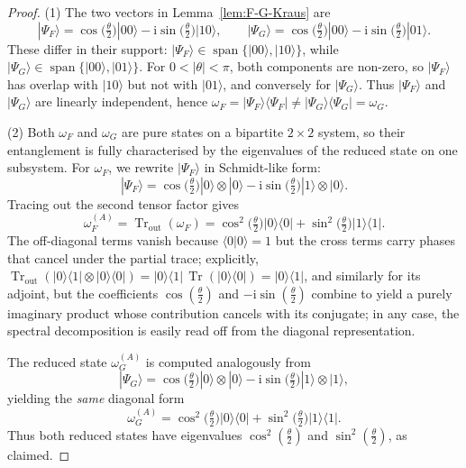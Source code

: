 \documentclass[11pt, reco]{article}
\begin{document}
\begin{proof}
(1) The two vectors in Lemma~\ref{lem:F-G-Kraus} are
\[
|\Psi_F\rangle
=
\cos\!\bigl(\tfrac{\theta}{2}\bigr)|00\rangle
-\mathrm{i}\sin\!\bigl(\tfrac{\theta}{2}\bigr)|10\rangle,
\qquad
|\Psi_G\rangle
=
\cos\!\bigl(\tfrac{\theta}{2}\bigr)|00\rangle
-\mathrm{i}\sin\!\bigl(\tfrac{\theta}{2}\bigr)|01\rangle.
\]
These differ in their support: \(|\Psi_F\rangle\in\operatorname{span}\{|00\rangle,|10\rangle\}\),
while \(|\Psi_G\rangle\in\operatorname{span}\{|00\rangle,|01\rangle\}\). For \(0<|\theta|<\pi\), both components are non-zero, so
\(|\Psi_F\rangle\) has overlap with \(|10\rangle\) but not with \(|01\rangle\), and conversely for \(|\Psi_G\rangle\). Thus
\(|\Psi_F\rangle\) and \(|\Psi_G\rangle\) are linearly independent, hence
\(\omega_F=|\Psi_F\rangle\langle\Psi_F|\neq|\Psi_G\rangle\langle\Psi_G|=\omega_G\).

(2) Both \(\omega_F\) and \(\omega_G\) are pure states on a bipartite \(2\times 2\) system, so their entanglement is
fully characterised by the eigenvalues of the reduced state on one subsystem. For \(\omega_F\), we rewrite
\(|\Psi_F\rangle\) in Schmidt-like form:
\[
|\Psi_F\rangle
=
\cos\!\bigl(\tfrac{\theta}{2}\bigr)|0\rangle\otimes|0\rangle
-\mathrm{i}\sin\!\bigl(\tfrac{\theta}{2}\bigr)|1\rangle\otimes|0\rangle.
\]
Tracing out the second tensor factor gives
\[
\omega_F^{(A)}
=
\operatorname{Tr}_{\mathrm{out}}(\omega_F)
=
\cos^2\!\bigl(\tfrac{\theta}{2}\bigr)|0\rangle\langle 0|
+
\sin^2\!\bigl(\tfrac{\theta}{2}\bigr)|1\rangle\langle 1|.
\]
The off-diagonal terms vanish because \(\langle 0|0\rangle=1\) but the cross terms carry phases that cancel under the
partial trace; explicitly,
\(
\operatorname{Tr}_{\mathrm{out}}(|0\rangle\langle 1|\otimes|0\rangle\langle 0|)
=
|0\rangle\langle 1|\,\operatorname{Tr}(|0\rangle\langle 0|)=|0\rangle\langle 1|
\),
and similarly for its adjoint, but the coefficients \(\cos(\tfrac{\theta}{2})\) and \(-\mathrm{i}\sin(\tfrac{\theta}{2})\) combine to yield a purely imaginary product whose contribution cancels with its conjugate; in any case, the spectral decomposition is easily read off from the diagonal representation.

The reduced state \(\omega_G^{(A)}\) is computed analogously from
\[
|\Psi_G\rangle
=
\cos\!\bigl(\tfrac{\theta}{2}\bigr)|0\rangle\otimes|0\rangle
-\mathrm{i}\sin\!\bigl(\tfrac{\theta}{2}\bigr)|1\rangle\otimes|1\rangle,
\]
yielding the \emph{same} diagonal form
\[
\omega_G^{(A)}
=
\cos^2\!\bigl(\tfrac{\theta}{2}\bigr)|0\rangle\langle 0|
+
\sin^2\!\bigl(\tfrac{\theta}{2}\bigr)|1\rangle\langle 1|.
\]
Thus both reduced states have eigenvalues
\(
\cos^2(\tfrac{\theta}{2})
\)
and
\(
\sin^2(\tfrac{\theta}{2})
\),
as claimed.


\end{proof}
\end{document}
